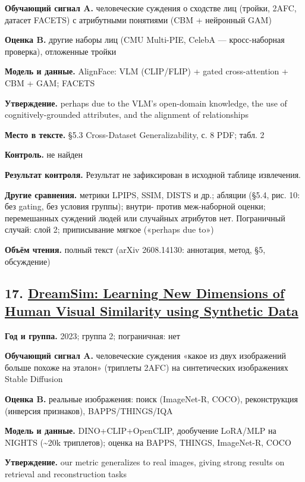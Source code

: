 \textbf{Обучающий сигнал A.} человеческие суждения о сходстве лиц (тройки, 2AFC, датасет FACETS) с атрибутными понятиями (CBM + нейронный GAM)

\textbf{Оценка B.} другие наборы лиц (CMU Multi-PIE, CelebA — кросс-наборная проверка), отложенные тройки

\textbf{Модель и данные.} AlignFace: VLM (CLIP/FLIP) + gated cross-attention + CBM + GAM; FACETS

\textbf{Утверждение.} perhaps due to the VLM's open-domain knowledge, the use of cognitively-grounded attributes, and the alignment of relationships

\textbf{Место в тексте.} §5.3 Cross-Dataset Generalizability, с. 8 PDF; табл. 2

\textbf{Контроль.} не найден

\textbf{Результат контроля.} Результат не зафиксирован в исходной таблице извлечения.

\textbf{Другие сравнения.} метрики LPIPS, SSIM, DISTS и др.; абляции (§5.4, рис. 10: без gating, без условия группы); внутри- против меж-наборной оценки; перемешанных суждений людей или случайных атрибутов нет. Пограничный случай: слой 2; приписывание мягкое («perhaps due to»)

\textbf{Объём чтения.} полный текст (arXiv 2608.14130: аннотация, метод, §5, обсуждение)


\subsection*{17. \href{https://doi.org/10.52202/075280-2208}{DreamSim: Learning New Dimensions of Human Visual Similarity using Synthetic Data}}

\textbf{Год и группа.} 2023; группа 2; пограничная: нет

\textbf{Обучающий сигнал A.} человеческие суждения «какое из двух изображений больше похоже на эталон» (триплеты 2AFC) на синтетических изображениях Stable Diffusion

\textbf{Оценка B.} реальные изображения: поиск (ImageNet-R, COCO), реконструкция (инверсия признаков), BAPPS/THINGS/IQA

\textbf{Модель и данные.} DINO+CLIP+OpenCLIP, дообучение LoRA/MLP на NIGHTS (\textasciitilde{}20k триплетов); оценка на BAPPS, THINGS, ImageNet-R, COCO

\textbf{Утверждение.} our metric generalizes to real images, giving strong results on retrieval and reconstruction tasks

